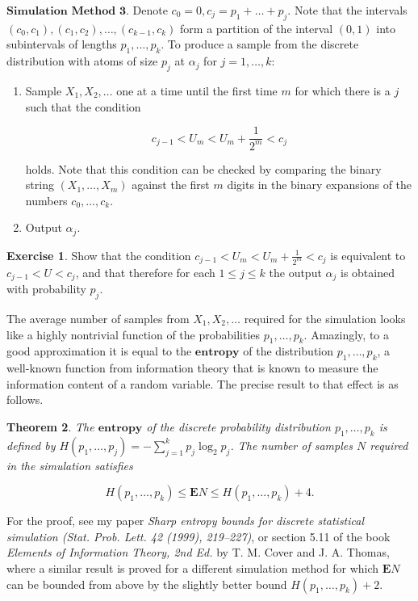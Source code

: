 \documentclass[11pt]{report}
\theoremstyle{plain}
\newtheorem{thm}{Theorem}[chapter]
\theoremstyle{definition}
\newtheorem{xexercise}[thm]{Exercise}
\begin{document}
$\textbf{Simulation Method 3.}$ Denote
$c_0 = 0, c_j = p_1+\ldots+p_j$. Note that the
intervals $(c_0,c_1), (c_1,c_2),\ldots, (c_{k-1},c_k)$
form a partition of the interval $(0,1)$ into
subintervals of lengths $p_1,\ldots,p_k$. To produce
a sample from the discrete distribution with atoms of
size $p_j$ at $\alpha_j$ for $j=1,\ldots,k$:

\begin{enumerate}[label=\arabic*.]
\item Sample $X_1,X_2,\ldots$ one at a time until the first
time $m$ for which there is a $j$ such that the
condition

\[
c_{j-1} < U_m < U_m+\frac{1}{2^m} < c_j
\]

\noindent holds. Note that this condition can be checked by
comparing the binary string $(X_1,\ldots,X_m)$
against the first $m$ digits in the binary expansions
of the numbers $c_0,\ldots,c_k$.

\item Output $\alpha_j$.
\end{enumerate}

\begin{xexercise}
Show that the condition
$c_{j-1} < U_m < U_m+\frac{1}{2^m} < c_j$ is
equivalent to $c_{j-1} < U < c_j$, and that therefore
for each $1\le j\le k$ the output $\alpha_j$ is
obtained with probability $p_j$.
\end{xexercise}

\noindent The average number of samples from $X_1,X_2,\ldots$
required for the simulation looks like a highly
nontrivial function of the probabilities
$p_1,\ldots,p_k$. Amazingly, to a good approximation
it is equal to the $\textbf{entropy}$ of the
distribution $p_1,\ldots,p_k$, a well-known function
from information theory that is known to measure the
information content of a random variable. The precise
result to that effect is as follows.

\begin{thm}
The $\textbf{entropy}$ of the discrete probability
distribution $p_1,\ldots,p_k$ is defined by
$H(p_1,\ldots,p_j) = -\sum_{j=1}^k p_j \log_2 p_j$.
The number of samples $N$ required in the simulation
satisfies

\[
H(p_1,\ldots,p_k) \le \mathbf{E} N \le H(p_1,\ldots,p_k) + 4.
\]

\end{thm}

\noindent For the proof, see my paper \emph{Sharp entropy bounds for
discrete statistical simulation (Stat. Prob. Lett. 42
(1999), 219--227)}, or section 5.11 of the book
\emph{Elements of Information Theory, 2nd Ed.} by T. M.
Cover and J. A. Thomas, where a similar result is
proved for a different simulation method for which
$\mathbf{E} N$ can be bounded from above by the
slightly better bound $H(p_1,\ldots,p_k)+2$.
\end{document}
